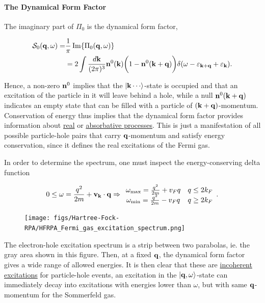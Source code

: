 \documentclass{homework}
\begin{document}
\paragraph{The Dynamical Form Factor}

The imaginary part of $\Pi_0$ is the dynamical form factor,

\begin{equation}
    \begin{split}
        \mathcal{S}_{0}({\bf q}, \omega) =& \frac{1}{\pi} \Im{\Pi_0({\bf q}, \omega)} \\
        &= 2 \int \frac{d{\bf k}}{(2\pi)^3} {\bf n}^{0}({\bf k}) \bigg(1-{\bf n}^{0}({\bf k+q})\bigg) \delta(\omega - \varepsilon_{{\bf k+q}} + \varepsilon_{{\bf k}}).
    \end{split}
\end{equation}

Hence, a non-zero ${\bf n}^{0}$ implies that the $\ket{{\bf k} \cdots}$-state is occupied and that an excitation of the particle in it will leave behind a hole, while a null ${\bf n}^{0}({\bf k+q})$ indicates an empty state that can be filled with a particle of $({\bf k+q})$-momentum. Conservation of energy thus implies that the dynamical form factor provides information about \underline{real} or \underline{absorbative processes}. This is just a manifestation of all possible particle-hole pairs that carry ${\bf q}$-momentum and satisfy energy conservation, since it defines the real excitations of the Fermi gas.

In order to determine the spectrum, one must inspect the energy-conserving delta function

\begin{equation}
    0 \leq \omega = \frac{q^2}{2m} + {\bf v_k} \cdot {\bf q} \Rightarrow \begin{array}{cc}
         \omega_{\textnormal{max}} = \frac{q^2}{2m} + v_F q & q \leq 2k_F \\
         \omega_{\textnormal{min}} = \frac{q^2}{2m} - v_F q & q \geq 2k_F
    \end{array}.
\end{equation}

\begin{figure}
\texttt{[image: figs/Hartree-Fock-RPA/HFRPA\_Fermi\_gas\_excitation\_spectrum.png]}
\end{figure}  

The electron-hole excitation spectrum is a strip between two parabolas, ie. the gray area shown in this figure. Then, at a fixed ${\bf q}$, the dynamical form factor gives a wide range of allowed energies. It is then clear that these are \underline{incoherent excitations} for particle-hole events, an excitation in the $\ket{{\bf q}, \omega}$-state can immediately decay into excitations with energies lower than $\omega$, but with same ${\bf q}$-momentum for the Sommerfeld gas. 
\end{document}

